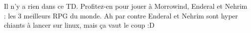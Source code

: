 Il n'y a rien dans ce TD. Profitez-en pour jouer à Morrowind, Enderal et Nehrim : les 3 meilleurs RPG du monde.
Ah par contre Enderal et Nehrim sont hyper chiants à lancer sur linux, mais ça vaut le coup :D

